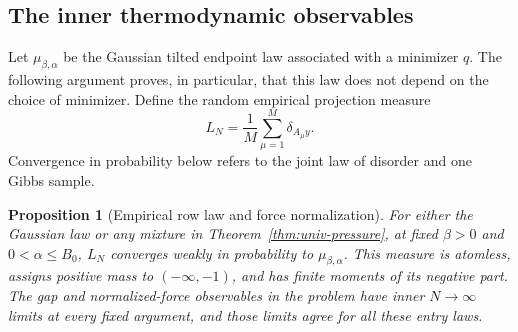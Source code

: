 \documentclass[11pt,a4paper]{article}
\numberwithin{equation}{section}
\newtheorem{proposition}[theorem]{Proposition}
\theoremstyle{definition}
\theoremstyle{remark}
\begin{document}
\subsection{The inner thermodynamic observables}

Let $\mu_{\beta,\alpha}$ be the Gaussian tilted endpoint law associated
with a minimizer $q$.  The following argument proves, in particular, that
this law does not depend on the choice of minimizer.  Define the random
empirical projection measure
\[
 L_N=\frac1M\sum_{\mu=1}^M\delta_{A_\mu y}.
\]
Convergence in probability below refers to the joint law of disorder and
one Gibbs sample.

\begin{proposition}[Empirical row law and force normalization]
\label{prop:univ-observables}
For either the Gaussian law or any mixture in
Theorem~\ref{thm:univ-pressure}, at fixed $\beta>0$ and
$0<\alpha\le B_0$, $L_N$ converges weakly in probability to
$\mu_{\beta,\alpha}$.  This measure is atomless, assigns positive mass
to $(-\infty,-1)$, and has finite moments of its negative part.
The gap and normalized-force observables in the problem have inner
$N\to\infty$ limits at every fixed argument, and those limits agree
for all these entry laws.
\end{proposition}
\end{document}
